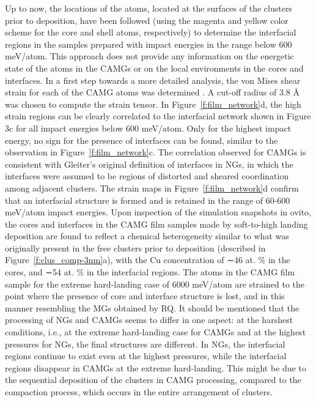 \begin{selfcite}
Up to now, the locations of the atoms, located at the surfaces of the clusters prior to deposition, have been followed (using the magenta and yellow color scheme for the core and shell atoms, respectively) to determine the interfacial regions in the samples prepared with impact energies in the range below 600 meV/atom. This approach does not provide any information on the energetic state of the atoms in the CAMGs or on the local environments in the cores and interfaces. In a first step towards a more detailed analysis, the von Mises shear strain for each of the CAMG atoms was determined \cite{Stukowski2014}. A cut-off radius of 3.8 \r{A} was chosen to compute the strain tensor. In Figure~\ref{f:film_network}d, the high strain regions can be clearly correlated to the interfacial network shown in Figure 3c for all impact energies below 600 meV/atom. Only for the highest impact energy, no sign for the presence of interfaces can be found, similar to the observation in Figure~\ref{f:film_network}c. The correlation observed for CAMGs is consistent with Gleiter’s original definition of interfaces \cite{Gleiter1991} in NGs, in which the interfaces were assumed to be regions of distorted and sheared coordination among adjacent clusters. The strain maps in Figure~\ref{f:film_network}d confirm that an interfacial structure is formed and is retained in the range of 60-600 meV/atom impact energies. Upon inspection of the simulation snapshots in \gls{ovito}, the cores and interfaces in the CAMG film samples made by soft-to-high landing deposition are found to reflect a chemical heterogeneity similar to what was originally present in the free clusters prior to deposition (described in Figure~\ref{f:clus_comp-3nm}a), with the Cu concentration of ∼46 at. \% in the cores, and ∼54 at. \% in the interfacial regions. The atoms in the CAMG film sample for the extreme hard-landing case of 6000 meV/atom are strained to the point where the presence of core and interface structure is lost, and in this manner resembling the MGs obtained by RQ. It should be mentioned that the processing of NGs and CAMGs seems to differ in one aspect: at the harshest conditions, i.e., at the extreme hard-landing case for CAMGs and at the highest pressures for NGs, the final structures are different. In NGs, the interfacial regions continue to exist even at the highest pressures, while the interfacial regions disappear in CAMGs at the extreme hard-landing. This might be due to the sequential deposition of the clusters in CAMG processing, compared to the compaction process, which occurs in the entire arrangement of clusters. \par


\end{selfcite}
